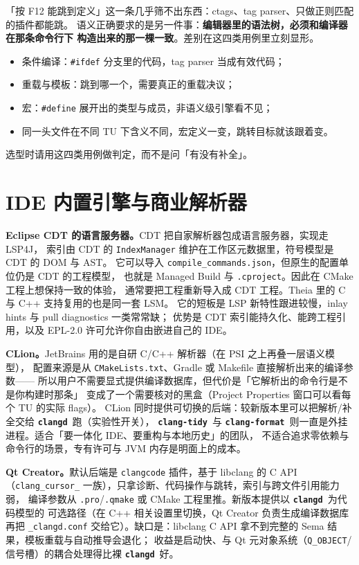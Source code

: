 \documentclass[12pt,a4paper,fontset=fandol]{ctexbook}
\newcommand{\Bk}{\discretionary{}{}{}}
\newcommand{\Lib}[1]{\textbf{\texttt{#1}}}
\newcommand{\Tidy}{\Lib{clang-tidy}}
\newcommand{\Fmt}{\Lib{clang-format}}
\newcommand{\CD}{\Lib{clangd}}
\begin{document}
\begin{compare}[title={能跳转不等于语义正确}]
「按 F12 能跳到定义」这一条几乎筛不出东西：ctags、tag parser、只做正则匹配的插件都能跳。
语义正确要求的是另一件事：\textbf{编辑器里的语法树，必须和编译器在那条命令行下
构造出来的那一棵一致}。差别在这四类用例里立刻显形。
\begin{itemize}
  \item 条件编译：\texttt{\#ifdef} 分支里的代码，tag parser 当成有效代码；
  \item 重载与模板：跳到哪一个，需要真正的重载决议；
  \item 宏：\texttt{\#define} 展开出的类型与成员，非语义级引擎看不见；
  \item 同一头文件在不同 TU 下含义不同，宏定义一变，跳转目标就该跟着变。
\end{itemize}
选型时请用这四类用例做判定，而不是问「有没有补全」。
\end{compare}

\section{IDE 内置引擎与商业解析器}\label{sec:ch06-s4}

\textbf{Eclipse CDT 的语言服务器。}CDT 把自家解析器包成语言服务器，实现走 LSP4J，
索引由 CDT 的 \texttt{IndexManager} 维护在工作区元数据里，符号模型是 CDT 的 DOM 与 AST。
它可以导入 \texttt{compile\_commands.json}，但原生的配置单位仍是 CDT 的工程模型，
也就是 Managed Build 与 \texttt{.cproject}。因此在 CMake 工程上想保持一致的体验，
通常要把工程重新导入成 CDT 工程。Theia 里的 C 与 C++ 支持复用的也是同一套 LSM。
它的短板是 LSP 新特性跟进较慢，inlay hints 与 pull diagnostics 一类常常缺；
优势是 CDT 索引能持久化、能跨工程引用，以及 EPL-2.0 许可允许你自由嵌进自己的 IDE。

\textbf{CLion。}JetBrains 用的是自研 C/C++ 解析器（在 PSI 之上再叠一层语义模型），
配置来源是从 \texttt{CMakeLists.txt}、Gradle 或 Makefile 直接解析出来的编译参数——
所以用户不需要显式提供编译数据库，但代价是「它解析出的命令行是不是你构建时那条」
变成了一个需要核对的黑盒（Project Properties 窗口可以看每个 TU 的实际 flags）。
CLion 同时提供可切换的后端：较新版本里可以把解析/补全交给 \CD\ 跑（实验性开关），
\Tidy\ 与 \Fmt\ 则一直是外挂进程。适合「要一体化 IDE、要重构与本地历史」的团队，
不适合追求零依赖与命令行的场景，专有许可与 JVM 内存是明面上的成本。

\textbf{Qt Creator。}默认后端是 \texttt{clangcode} 插件，基于 libclang 的 C API
（\texttt{clang\_cursor\_} 一族），只拿诊断、代码操作与跳转，索引与跨文件引用能力弱，
编译参数从 \texttt{.pro}/{\Bk}\texttt{.qmake} 或 CMake 工程里推。新版本提供以 \CD\ 为代码模型的
可选路径（在 C++ 相关设置里切换，Qt Creator 负责生成编译数据库再把 \texttt{\_clangd.conf}
交给它）。缺口是：libclang C API 拿不到完整的 Sema 结果，模板重载与自动推导会退化；
收益是启动快、与 Qt 元对象系统（\texttt{Q\_OBJECT}/信号槽）的耦合处理得比裸 \CD\ 好。
\end{document}
